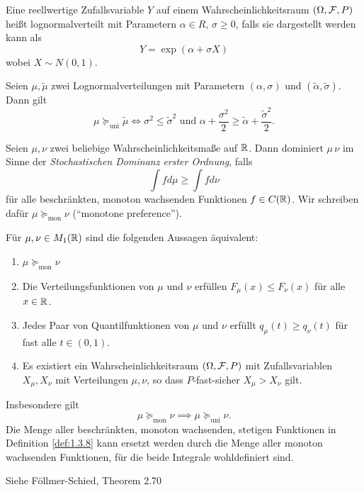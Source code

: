 \documentclass[a4paper,twoside,DIV15,BCOR12mm]{scrbook}
\newcommand{\unisucceq}{\succeq_{\text{uni}}}
\newcommand{\monsucceq}{\succeq_{\text{mon}}}
\begin{document}
\begin{definition}
Eine reellwertige Zufallsvariable $Y$ auf einem Wahrscheinlichkeitsraum $(\Omega, \mathcal{F}, P)$ heißt lognormalverteilt mit Parametern $\alpha\in R$, $\sigma \ge 0$, falls sie dargestellt werden kann als 
\[
Y = \exp(\alpha  + \sigma X)
\]
wobei $X \sim N(0, 1)$.
\end{definition}

\begin{satz}
Seien $\mu, \tilde\mu$ zwei Lognormalverteilungen mit Parametern $(\alpha,\sigma)$ und $(\tilde\alpha,\tilde\sigma)$. Dann gilt 
\[
\mu \unisucceq \tilde\mu \iff \sigma^2 \le \tilde\sigma^2 \text{ und } \alpha + \frac{\sigma^2}2 \ge \tilde\alpha + \frac{\tilde\sigma^2}2.
\]
\end{satz}

\begin{definition}
\label{def:1.3.8}Seien $\mu,\nu$ zwei beliebige Wahrscheinlichkeitsmaße auf $\mathbb{R}$. Dann dominiert $\mu \, \nu$ im Sinne der \emph{Stochastischen Dominanz erster Ordnung}, falls 
\[
\int f d\mu \ge \int fd\nu
\]
für alle beschränkten, monoton wachsenden Funktionen $f\in C(\mathbb{R})$. Wir schreiben dafür $\mu\monsucceq \nu$ (“monotone preference”).
\end{definition}

\begin{satz}
\label{satz:1.3.9}Für $\mu,\nu \in M_1(\mathbb{R})$ sind die folgenden Aussagen äquivalent:
\begin{enumerate}
\item $\mu\monsucceq\nu$
\item Die Verteilungsfunktionen von $\mu$ und $\nu$ erfüllen $F_\mu(x) \le F_\nu(x)$ für alle $x\in\mathbb{R}$.
\item Jedes Paar von Quantilfunktionen von $\mu$ und $\nu$ erfüllt $q_\mu(t) \ge q_\nu(t)$ für fast alle $t\in(0, 1)$.
\item Es existiert ein Wahrscheinlichkeitsraum $(\Omega,\mathcal{F}, P)$ mit Zufallsvariablen $X_\mu, X_\nu$ mit Verteilungen $\mu, \nu$, so dass $P$-fast-sicher $X_\mu > X_\nu$ gilt.
\end{enumerate}
Insbesondere gilt \[
\mu\monsucceq\nu \implies \mu\unisucceq\nu.
\]
Die Menge aller beschränkten, monoton wachsenden, stetigen Funktionen in Definition \ref{def:1.3.8} kann ersetzt werden durch die Menge aller monoton wachsenden Funktionen, für die beide Integrale wohldefiniert sind.
\end{satz}

\begin{beweis}
Siehe Föllmer-Schied, Theorem 2.70
\end{beweis}
\end{document}

